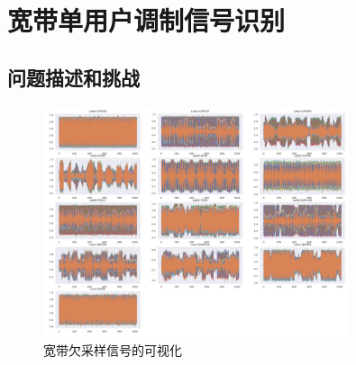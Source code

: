 \section{宽带单用户调制信号识别}\label{sec:background}









\subsection{问题描述和挑战}\label{sec:background}

\begin{figure}
    \centering
    \includegraphics[width=0.8\textwidth]{Image/modulations.jpg}
    \caption{宽带欠采样信号的可视化}
    \label{fig:modulations}
\end{figure}

